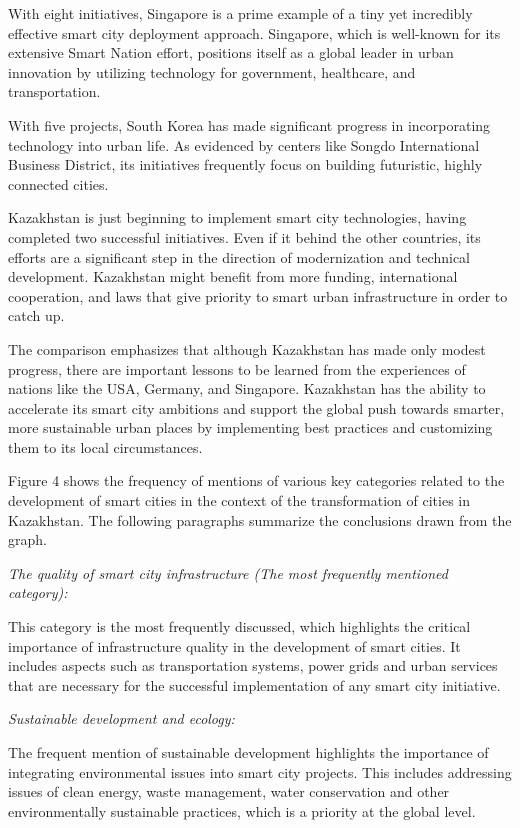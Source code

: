 \begin{multicols}{2}
With eight initiatives, Singapore is a prime example of a tiny yet
incredibly effective smart city deployment approach. Singapore, which is
well-known for its extensive Smart Nation effort, positions itself as a
global leader in urban innovation by utilizing technology for
government, healthcare, and transportation.

With five projects, South Korea has made significant progress in
incorporating technology into urban life. As evidenced by centers like
Songdo International Business District, its initiatives frequently focus
on building futuristic, highly connected cities.

Kazakhstan is just beginning to implement smart city technologies,
having completed two successful initiatives. Even if it behind the other
countries, its efforts are a significant step in the direction of
modernization and technical development. Kazakhstan might benefit from
more funding, international cooperation, and laws that give priority to
smart urban infrastructure in order to catch up.

The comparison emphasizes that although Kazakhstan has made only modest
progress, there are important lessons to be learned from the experiences
of nations like the USA, Germany, and Singapore. Kazakhstan has the
ability to accelerate its smart city ambitions and support the global
push towards smarter, more sustainable urban places by implementing best
practices and customizing them to its local circumstances.

Figure 4 shows the frequency of mentions of various key categories
related to the development of smart cities in the context of the
transformation of cities in Kazakhstan. The following paragraphs
summarize the conclusions drawn from the graph.

\emph{The quality of smart city infrastructure (The most frequently
mentioned category):}

This category is the most frequently discussed, which highlights the
critical importance of infrastructure quality in the development of
smart cities. It includes aspects such as transportation systems, power
grids and urban services that are necessary for the successful
implementation of any smart city initiative.

\emph{Sustainable development and ecology:}

The frequent mention of sustainable development highlights the
importance of integrating environmental issues into smart city projects.
This includes addressing issues of clean energy, waste management, water
conservation and other environmentally sustainable practices, which is a
priority at the global level.


\end{multicols}
